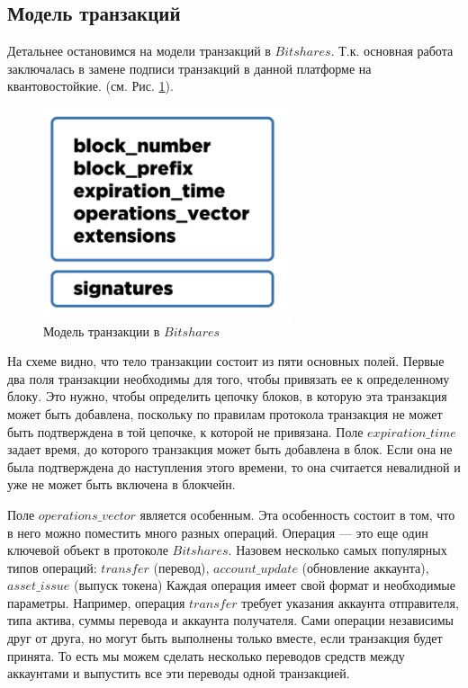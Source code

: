 \documentclass[a4paper, 14pt]{extarticle}
\begin{document}
\subsection{Модель транзакций}
Детальнее остановимся на модели транзакций в $Bitshares$. Т.к. основная работа заключалась в замене подписи транзакций в данной платформе на квантовостойкие. (см. Рис. \ref{fig:Bitshares_trx_model}).

\begin{figure}[h]
    \centering
    \includegraphics[scale=0.5]{Bitshares_trx_model.png}
    \caption{Модель транзакции в $Bitshares$}
    \label{fig:Bitshares_trx_model}
\end{figure}

На схеме видно, что тело транзакции состоит из пяти основных полей. Первые два поля транзакции необходимы для того, чтобы привязать ее к определенному блоку. Это нужно, чтобы определить цепочку блоков, в которую эта транзакция может быть добавлена, поскольку по правилам протокола транзакция не может быть подтверждена в той цепочке, к которой не привязана. Поле $expiration\_time$ задает время, до которого транзакция может быть добавлена в блок. Если она не была подтверждена до наступления этого времени, то она считается невалидной и уже не может быть включена в блокчейн.

Поле $operations\_vector$ является особенным. Эта особенность состоит в том, что в него можно поместить много разных операций. Операция — это еще один ключевой объект в протоколе $Bitshares$. Назовем несколько самых популярных типов операций: $transfer$ (перевод), $account\_update$ (обновление аккаунта), $asset\_issue$ (выпуск токена) Каждая операция имеет свой формат и необходимые параметры. Например, операция $transfer$ требует указания аккаунта отправителя, типа актива, суммы перевода и аккаунта получателя. Сами операции независимы друг от друга, но могут быть выполнены только вместе, если транзакция будет принята. То есть мы можем сделать несколько переводов средств между аккаунтами и выпустить все эти переводы одной транзакцией.
\end{document}
